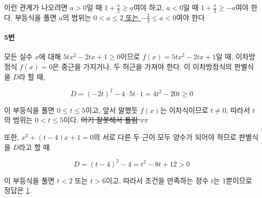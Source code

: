 \documentclass{article}
\begin{document}
이런 관계가 나오려면 $a > 0$일 때 $1 + \frac{a}{2} \ge a$여야 하고, $a < 0$일 때 $1 + \frac{a}{2} \ge -a$여야 한다. 부등식을 풀면 $a$의 범위는 \underline{$0 < a \le 2$ 또는 $-\frac{2}{3} \le a < 0$}여야 한다.

\paragraph{5번}
모든 실수 $x$에 대해 $5tx^2 - 2tx + 1 \ge 0$이므로 $f(x) = 5tx^2 - 2tx + 1$일 때, 이차방정식 $f(x) = 0$은 중근을 가지거나, 두 허근을 가져야 한다. 이 이차방정식의 판별식을 $D$라 할 때,

\[
    D = (-2t)^2 - 4 \cdot 5t \cdot 1 = 4t^2 - 20t \ge 0
\]

이 부등식을 풀면 $0 \le t \le 5$이고, 앞서 말했듯 $f(x)$는 이차식이므로 $t \not = 0$, 따라서 $t$의 범위는 $0 < t \le 5$이다. \sout{이거 잘못해서 틀림 $\pi\pi$} \newline

또한, $x^2 + (t - 4)x + 1 = 0$의 서로 다른 두 근이 모두 양수가 되어야 하므로 판별식을 $D$라고 할 때

\[
    D = (t - 4)^2 - 4 = t^2 - 8t + 12 > 0
\]

이 부등식을 풀면 $t < 2$ 또는 $t > 6$이고, 따라서 조건을 만족하는 정수 $t$는 1뿐이므로 정답은 \underline{1}.
\end{document}
